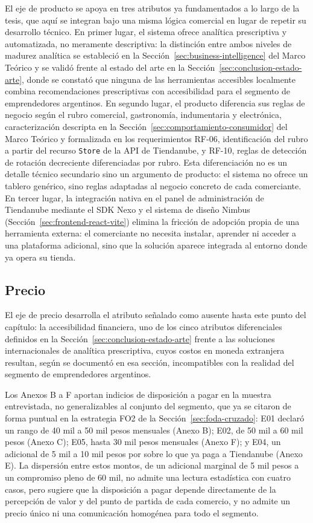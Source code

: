 El eje de producto se apoya en tres atributos ya fundamentados a lo largo de la tesis, que aquí se integran bajo una misma lógica comercial en lugar de repetir su desarrollo técnico. En primer lugar, el sistema ofrece analítica prescriptiva y automatizada, no meramente descriptiva: la distinción entre ambos niveles de madurez analítica se estableció en la Sección~\ref{sec:business-intelligence} del Marco Teórico y se validó frente al estado del arte en la Sección~\ref{sec:conclusion-estado-arte}, donde se constató que ninguna de las herramientas accesibles localmente combina recomendaciones prescriptivas con accesibilidad para el segmento de emprendedores argentinos. En segundo lugar, el producto diferencia sus reglas de negocio según el rubro comercial, gastronomía, indumentaria y electrónica, caracterización descripta en la Sección~\ref{sec:comportamiento-consumidor} del Marco Teórico y formalizada en los requerimientos RF-06, identificación del rubro a partir del recurso \texttt{Store} de la API de Tiendanube, y RF-10, reglas de detección de rotación decreciente diferenciadas por rubro. Esta diferenciación no es un detalle técnico secundario sino un argumento de producto: el sistema no ofrece un tablero genérico, sino reglas adaptadas al negocio concreto de cada comerciante. En tercer lugar, la integración nativa en el panel de administración de Tiendanube mediante el SDK Nexo y el sistema de diseño Nimbus (Sección~\ref{sec:frontend-react-vite}) elimina la fricción de adopción propia de una herramienta externa: el comerciante no necesita instalar, aprender ni acceder a una plataforma adicional, sino que la solución aparece integrada al entorno donde ya opera su tienda.

\subsection{Precio}
\label{sec:triple-p-precio}

El eje de precio desarrolla el atributo señalado como ausente hasta este punto del capítulo: la accesibilidad financiera, uno de los cinco atributos diferenciales definidos en la Sección~\ref{sec:conclusion-estado-arte} frente a las soluciones internacionales de analítica prescriptiva, cuyos costos en moneda extranjera resultan, según se documentó en esa sección, incompatibles con la realidad del segmento de emprendedores argentinos.

Los Anexos B a F aportan indicios de disposición a pagar en la muestra entrevistada, no generalizables al conjunto del segmento, que ya se citaron de forma puntual en la estrategia FO2 de la Sección~\ref{sec:foda-cruzado}: E01 declaró un rango de 40 mil a 50 mil pesos mensuales (Anexo B); E02, de 50 mil a 60 mil pesos (Anexo C); E05, hasta 30 mil pesos mensuales (Anexo F); y E04, un adicional de 5 mil a 10 mil pesos por sobre lo que ya paga a Tiendanube (Anexo E). La dispersión entre estos montos, de un adicional marginal de 5 mil pesos a un compromiso pleno de 60 mil, no admite una lectura estadística con cuatro casos, pero sugiere que la disposición a pagar depende directamente de la percepción de valor y del punto de partida de cada comercio, y no admite un precio único ni una comunicación homogénea para todo el segmento.

